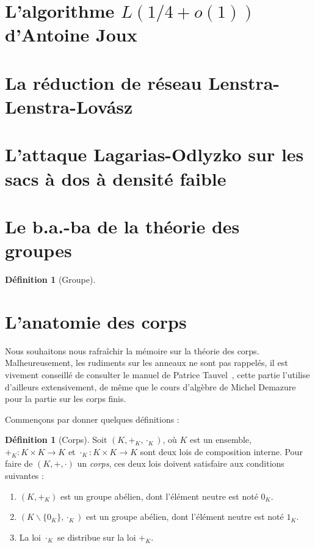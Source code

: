 \documentclass[a4paper, titlepage]{article}
\theoremstyle{definition}
\newtheorem{defi}[theo]{Définition}
\theoremstyle{remark}
\def\o{o}
\begin{document}
\section{L'algorithme $L(1/4 + \o(1))$ d'Antoine Joux}

\section{La réduction de réseau Lenstra-Lenstra-Lov\'asz}

\section{L'attaque Lagarias-Odlyzko sur les sacs à dos à densité faible}

\newpage
\appendix

\section{Le b.a.-ba de la théorie des groupes}
\begin{defi}[Groupe]

\end{defi}

\section{L'anatomie des corps}

Nous souhaitons nous rafraîchir la mémoire sur la théorie des corps. Malheureusement, les rudiments sur les anneaux ne sont pas rappelés, il est vivement conseillé de consulter le manuel de Patrice Tauvel~\cite{tauvel2008}, cette partie l'utilise d'ailleurs extensivement, de même que le cours d'algèbre de Michel Demazure~\cite{demazure2008} pour la partie sur les corps finis. 

Commençons par donner quelques définitions :

\begin{defi}[Corps]
Soit $(K,+_K,\cdot_K)$, où $K$ est un ensemble, $+_K : K \times K \rightarrow K$ et $\cdot_K: K \times K \rightarrow K$ sont deux lois de composition interne. Pour faire de $(K,+,\cdot)$ un \textit{corps}, ces deux lois doivent satisfaire aux conditions suivantes : \begin{enumerate}
\item $(K,+_K)$ est un groupe abélien, dont l'élément neutre est noté $0_K$.
\item $(K\backslash \{0_K\},\cdot_K)$ est un groupe abélien, dont l'élément neutre est noté $1_K$.
\item La loi $\cdot_K$ se distribue sur la loi $+_K$.
\end{enumerate}
\end{defi}
\end{document}
